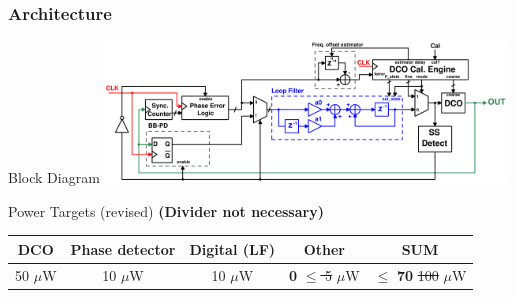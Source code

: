 \documentclass[t, screen, aspectratio=43]{beamer}
\begin{document}



\begin{frame}
	\frametitle{Architecture}
	\begin{block}{Block Diagram}
	\center\includegraphics[width=0.8\textwidth, angle=0]{pll_master_arch_28feb2020}

	\end{block}
		\begin{block}{Power Targets {\color{red}(revised)}}
		\scriptsize
		{\color{red}\textbf{(Divider not necessary)}}
		\vspace{-1em}
		\begin{table}[htb!]
			\tiny
			\centering
			\def\arraystretch{1.5}		
			\setlength\arrayrulewidth{0.75pt}
			\setlength{\tabcolsep}{1em} %
			\begin{tabular}{|c|c|c|c|c|}
				\hline 
				\rule[-1ex]{0pt}{2.5ex} \cellcolor{gray!40}\textbf{DCO} & \cellcolor{gray!40}\textbf{Phase detector} & \cellcolor{gray!40}\textbf{Digital (LF)}& \cellcolor{gray!40}\textbf{Other} & \cellcolor{gray!40}\textbf{SUM} \\ 
				\hline 
				\rule[-1ex]{0pt}{2.5ex} 50 $\mu$W& 10 $\mu$W &  10 $\mu$W  & \textbf{0} {\color{red}\st{$\leq$ 5}} $ \mu$W & $\leq$ \textbf{70} {\color{red}\st{100}} $\mu$W\\ 
				\hline 
			\end{tabular} 
		\end{table}   
	\end{block}

\end{frame}

\end{document}
